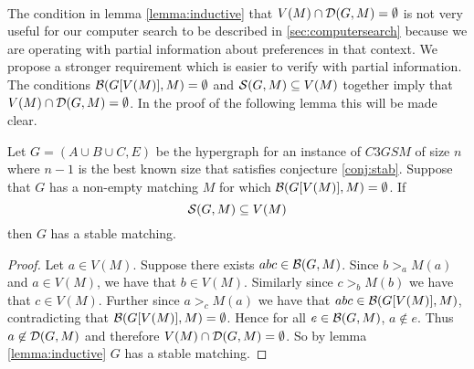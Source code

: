 \paragraph{}
The condition in lemma \ref{lemma:inductive} that $V(M) \cap \mathcal{D}(G,M) = \emptyset$ is not very useful for our computer search to be described in \ref{sec:computersearch} because we are operating with partial information about preferences in that context. We propose a stronger requirement which is easier to verify with partial information. The conditions $\mathcal{B}(G[V(M)], M) = \emptyset$ and $\mathcal{S}(G,M) \subseteq V(M)$ together imply that $V(M) \cap \mathcal{D}(G,M) = \emptyset$. In the proof of the following lemma this will be made clear.

\begin{lemma}\label{lemma:partialstab}
Let $G = (A\cup B \cup C, E)$ be the hypergraph for an instance of $C3GSM$ of size $n$ where $n-1$ is the best known size that  satisfies conjecture \ref{conj:stab}. Suppose that $G$ has a non-empty matching $M$ for which $\mathcal{B}(G[V(M)],M) = \emptyset$. If $$\mathcal{S}(G,M) \subseteq V(M)$$ then $G$ has a stable matching.
\end{lemma}
\begin{proof}
Let $a \in V(M)$. Suppose there exists $abc \in \mathcal{B}(G,M)$. Since $b >_a M(a)$ and $a \in V(M)$, we have that $b \in V(M)$. Similarly since $c >_b M(b)$ we have that $c \in V(M)$. Further since $a >_c M(a)$ we have that $abc \in \mathcal{B}(G[V(M)],M)$, contradicting that $\mathcal{B}(G[V(M)],M) = \emptyset$. Hence for all $e \in \mathcal{B}(G,M)$, $a \not\in e$. Thus $a\not \in \mathcal{D}(G,M)$ and therefore $V(M) \cap \mathcal{D}(G,M) = \emptyset$. So by lemma \ref{lemma:inductive} $G$ has a stable matching.
\end{proof}
